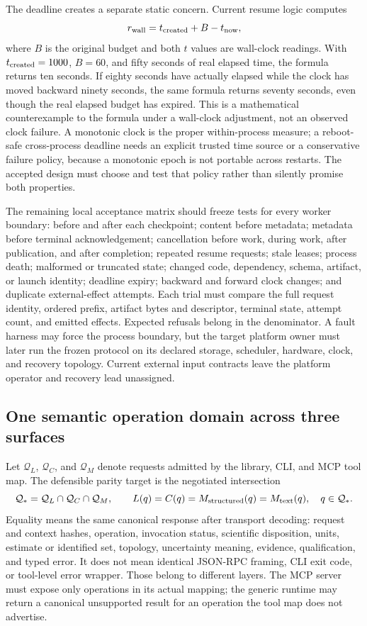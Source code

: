 The deadline creates a separate static concern. Current resume logic computes
\[
 r_{\rm wall}=t_{\rm created}+B-t_{\rm now},
\]
where $B$ is the original budget and both $t$ values are wall-clock readings.
With $t_{\rm created}=1000$, $B=60$, and fifty seconds of real elapsed time,
the formula returns ten seconds. If eighty seconds have actually elapsed while
the clock has moved backward ninety seconds, the same formula returns seventy
seconds, even though the real elapsed budget has expired. This is a
mathematical counterexample to the formula under a wall-clock adjustment, not
an observed clock failure. A monotonic clock is the proper within-process
measure; a reboot-safe cross-process deadline needs an explicit trusted time
source or a conservative failure policy, because a monotonic epoch is not
portable across restarts. The accepted design must choose and test that
policy rather than silently promise both properties.
\citep{exec14_failure_implementation,exec17_continuity_reference}

The remaining local acceptance matrix should freeze tests for every worker
boundary: before and after each checkpoint; content before metadata; metadata
before terminal acknowledgement; cancellation before work, during work,
after publication, and after completion; repeated resume requests; stale
leases; process death; malformed or truncated state; changed code, dependency,
schema, artifact, or launch identity; deadline expiry; backward and forward
clock changes; and duplicate external-effect attempts. Each trial must compare
the full request identity, ordered prefix, artifact bytes and descriptor,
terminal state, attempt count, and emitted effects. Expected refusals belong in
the denominator. A fault harness may force the process boundary, but the
target platform owner must later run the frozen protocol on its declared
storage, scheduler, hardware, clock, and recovery topology. Current external
input contracts leave the platform operator and recovery lead unassigned.
\citep{exec17_continuity_contract}

\subsection{One semantic operation domain across three surfaces}
\label{exec17:shared-operation}

Let $\mathcal Q_L$, $\mathcal Q_C$, and $\mathcal Q_M$ denote requests admitted
by the library, CLI, and MCP tool map. The defensible parity target is the
negotiated intersection
\[
 \mathcal Q_* = \mathcal Q_L\cap\mathcal Q_C\cap\mathcal Q_M,
 \qquad
 L(q)=C(q)=M_{\rm structured}(q)=M_{\rm text}(q),\quad q\in\mathcal Q_*.
\]
Equality means the same canonical response after transport decoding: request
and context hashes, operation, invocation status, scientific disposition,
units, estimate or identified set, topology, uncertainty meaning, evidence,
qualification, and typed error. It does not mean identical JSON-RPC framing,
CLI exit code, or tool-level error wrapper. Those belong to different layers.
The MCP server must expose only operations in its actual mapping; the generic
runtime may return a canonical unsupported result for an operation the tool
map does not advertise.~\citep{exec16_parity_design,exec16_parity_observed}


